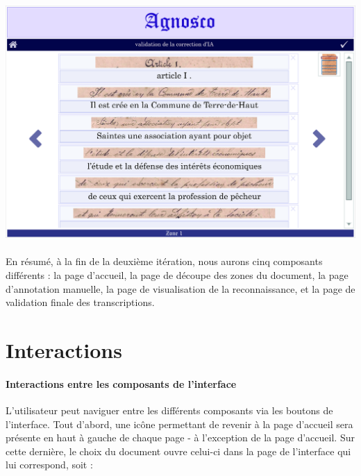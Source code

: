 \begin{mdframed}[frametitle={Figure 6 : Maquette de la page de validation finale lors de la deuxième itération}, innerbottommargin=10]
\begin{center}
\includegraphics[scale=0.04]{assets/maquetteIHMvalidationIA.jpg}
\end{center}
\end{mdframed}

\paragraph{}
En résumé, à la fin de la deuxième itération, nous aurons cinq composants différents : la page d’accueil, la page de découpe des zones du document, la page d’annotation manuelle, la page de visualisation de la reconnaissance, et la page de validation finale des transcriptions.

\section{Interactions}

\paragraph{Interactions entre les composants de l'interface}
L’utilisateur peut naviguer entre les différents composants via les boutons de l’interface.
\newline{}
Tout d’abord, une icône permettant de revenir à la page d’accueil sera présente en haut à gauche de chaque page - à l’exception de la page d’accueil. Sur cette dernière, le choix du document ouvre celui-ci dans la page de l’interface qui lui correspond, soit :


